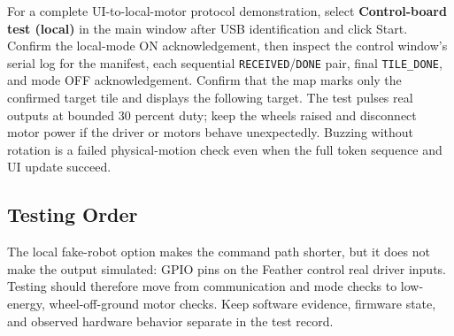 \documentclass{article}
\begin{document}
For a complete UI-to-local-motor protocol demonstration, select \textbf{Control-board test (local)} in the main window after USB identification and click Start. Confirm the local-mode ON acknowledgement, then inspect the control window's serial log for the manifest, each sequential \texttt{RECEIVED}/\texttt{DONE} pair, final \texttt{TILE\_DONE}, and mode OFF acknowledgement. Confirm that the map marks only the confirmed target tile and displays the following target. The test pulses real outputs at bounded 30 percent duty; keep the wheels raised and disconnect motor power if the driver or motors behave unexpectedly. Buzzing without rotation is a failed physical-motion check even when the full token sequence and UI update succeed.

\subsection{Testing Order}

The local fake-robot option makes the command path shorter, but it does not make the output simulated: GPIO pins on the Feather control real driver inputs. Testing should therefore move from communication and mode checks to low-energy, wheel-off-ground motor checks. Keep software evidence, firmware state, and observed hardware behavior separate in the test record.
\end{document}
